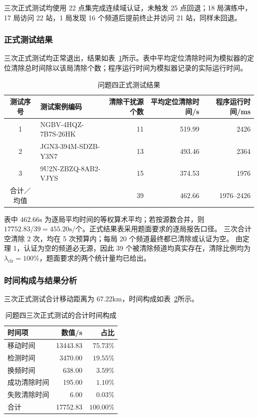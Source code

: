 三次正式测试均使用 22 点集完成连续域认证，未触发 25 点回退；18 局演练中，17 局访问 22 站，1 局发现 16 个频道后提前终止并访问 21 站，同样未回退。

\subsubsection{正式测试结果}

三次正式测试均正常退出，结果如表~\ref{tab:q4_formal}所示。表中平均定位清除时间为模拟器的定位清除总时间除以该局清除个数；程序运行时间为模拟器记录的实际运行时间。

\begin{table}[htbp]
\centering
\caption{问题四正式测试结果}
\label{tab:q4_formal}
\small
\setlength{\tabcolsep}{2pt}
\begin{tabular}{@{}clrrr@{}}
\toprule
测试序号 & 测试案例编码 & 清除干扰源个数 & 平均定位清除时间/s & 程序运行时间/ms \\
\midrule
1 & NGBV-4HQZ-7B7S-26HK & 11 & 519.99 & 2426 \\
2 & JGN3-394M-SDZB-Y3N7 & 13 & 493.46 & 2364 \\
3 & 9U2N-ZBZQ-8AB2-VJYS & 15 & 374.53 & 1976 \\
\midrule
合计／均值 &  & 39 & 462.66 & 1976--2426 \\
\bottomrule
\end{tabular}
\end{table}



表中 $462.66\mathrm{s}$ 为逐局平均时间的等权算术平均；若按源数合并，则 $17752.83/39=455.20\mathrm{s}/\text{个}$。正式结果表采用题面要求的逐局报告口径。
三次合计空清除 2 次，均在 5 次预算内；每局 20 个频道最终都已清除或认证为空。
由定理 1，认证为空的频道必无源，因此 39 个被清除频道均真实存在，清除比例均为 $\lambda_{\mathrm{clr}}=100\%$，题面要求的两个统计量均已给出。

\subsubsection{时间构成与结果分析}

三次正式测试合计移动距离为 $67.22\mathrm{km}$，时间构成如表~\ref{tab:q4_time}所示。

\begin{table}[htbp]
\centering
\caption{问题四三次正式测试的合计时间构成}
\label{tab:q4_time}
\begin{tabular}{lrr}
\toprule
时间项 & 数值/s & 占比 \\
\midrule
移动时间 & 13443.83 & $75.73\%$ \\
检测时间 & 3470.00 & $19.55\%$ \\
换频时间 & 638.00 & $3.59\%$ \\
成功清除时间 & 195.00 & $1.10\%$ \\
失败清除时间 & 6.00 & $0.03\%$ \\
\midrule
合计 & 17752.83 & $100.00\%$ \\
\bottomrule
\end{tabular}
\end{table}


